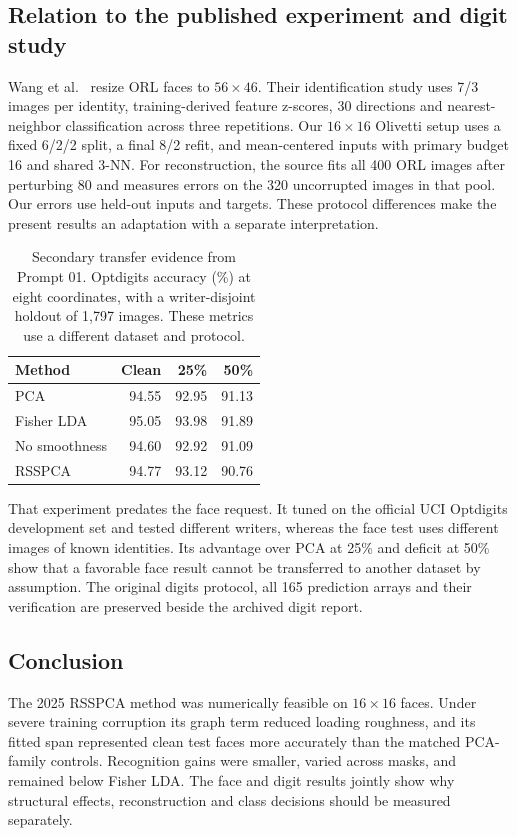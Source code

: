 \clearpage
\subsection{Relation to the published experiment and digit study}

Wang et al.\ \citep[Secs.~4.1--4.2]{wang2025} resize ORL faces to $56\times46$. Their identification study uses 7/3 images per identity, training-derived feature z-scores, 30 directions and nearest-neighbor classification across three repetitions. Our $16\times16$ Olivetti setup uses a fixed 6/2/2 split, a final 8/2 refit, and mean-centered inputs with primary budget 16 and shared 3-NN. For reconstruction, the source fits all 400 ORL images after perturbing 80 and measures errors on the 320 uncorrupted images in that pool. Our errors use held-out inputs and targets. These protocol differences make the present results an adaptation with a separate interpretation.

\begin{table}[H]\small\centering
\caption{Secondary transfer evidence from Prompt 01. Optdigits accuracy (\%) at eight coordinates, with a writer-disjoint holdout of 1,797 images. These metrics use a different dataset and protocol.}
\label{tab:digitsecondary}
\begin{tabular}{@{}lrrr@{}}
\toprule
Method & Clean & 25\% & 50\%\\
\midrule
PCA & 94.55 & 92.95 & 91.13\\
Fisher LDA & 95.05 & 93.98 & 91.89\\
No smoothness & 94.60 & 92.92 & 91.09\\
RSSPCA & 94.77 & 93.12 & 90.76\\
\bottomrule
\end{tabular}
\end{table}

That experiment predates the face request. It tuned on the official UCI Optdigits development set \citep{uci1998} and tested different writers, whereas the face test uses different images of known identities. Its advantage over PCA at 25\% and deficit at 50\% show that a favorable face result cannot be transferred to another dataset by assumption. The original digits protocol, all 165 prediction arrays and their verification are preserved beside the archived digit report.

\subsection*{Conclusion}
The 2025 RSSPCA method was numerically feasible on $16\times16$ faces. Under severe training corruption its graph term reduced loading roughness, and its fitted span represented clean test faces more accurately than the matched PCA-family controls. Recognition gains were smaller, varied across masks, and remained below Fisher LDA. The face and digit results jointly show why structural effects, reconstruction and class decisions should be measured separately.

